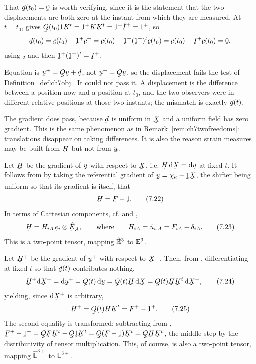 That $\bd(t_{0})=\bze$ is worth verifying, since it is the statement that
the two displacements are both zero at the instant from which they are
measured. At $t=t_{0}$,  gives
$\bQ(t_{0})\shift\bK^{t}=\shift^{+}\bK\bK^{t}=\shift^{+}\hI^{+}
=\shift^{+}$, so
\[
   \bd(t_{0})=\bc(t_{0})-\shift^{+}\bc^{+}
   =\bc(t_{0})-\shift^{+}(\shift^{+})^{t}\bc(t_{0})
   =\bc(t_{0})-\I^{+}\bc(t_{0})=\bze ,
\]
using $_{2}$ and then $\shift^{+}(\shift^{+})^{t}=\I^{+}$.

\begin{remark}\label{rem:ch7disp}
Equation  is $\bu^{+}=\bQ\bu+\bd$, not $\bu^{+}=\bQ\bu$, so
the displacement fails the test of Definition~\ref{def:ch7obj}. It could
not pass it. A displacement is the difference between a position now and
a position at $t_{0}$, and the two observers were in different relative
positions at those two instants; the mismatch is exactly $\bd(t)$.

The gradient does pass, because $\bd$ is uniform in $\bX$ and a uniform
field has zero gradient. This is the same phenomenon as in
Remark~\ref{rem:ch7twofreedoms}: translations disappear on taking
differences. It is also the reason strain measures may be built from
$\bH$ but not from $\bu$.
\end{remark}

Let $\bH$ be the gradient of $\bu$ with respect to $\bX$, i.e.
$\bH\,\dl\bX=\dl\bu$ at fixed $t$. It follows from  by taking
the referential gradient of $\bu=\bchi_{\kappa}-\shift\bX$, the shifter
being uniform so that its gradient is itself, that
\begin{equation}
   \bH=\bF-\shift .
   \tag{7.22}\label{eq:7.22}
\end{equation}
In terms of Cartesian components, cf.  and ,
\begin{equation}
   \bH=H_{iA}\,\be_{i}\otimes\hbE_{A},\qquad\text{where}\qquad
   H_{iA}=\hat u_{i,A}=F_{iA}-\dd_{iA}.
   \tag{7.23}\label{eq:7.23}
\end{equation}
This is a two-point tensor, mapping $\hat{\mathbb{E}}^{3}$ to $\mathbb{E}^{3}$.

Let $\bH^{+}$ be the gradient of $\bu^{+}$ with respect to $\bX^{+}$.
Then, from , differentiating at fixed $t$ so that $\bd(t)$
contributes nothing,
\begin{equation}
   \bH^{+}\dl\bX^{+}=\dl\bu^{+}=\bQ(t)\,\dl\bu=\bQ(t)\bH\,\dl\bX
   =\bQ(t)\bH\bK^{t}\,\dl\bX^{+},
   \tag{7.24}\label{eq:7.24}
\end{equation}
yielding, since $\dl\bX^{+}$ is arbitrary,
\begin{equation}
   \bH^{+}=\bQ(t)\bH\bK^{t}=\bF^{+}-\shift^{+}.
   \tag{7.25}\label{eq:7.25}
\end{equation}
The second equality is  transformed: subtracting 
from ,
$\bF^{+}-\shift^{+}=\bQ\bF\bK^{t}-\bQ\shift\bK^{t}
=\bQ(\bF-\shift)\bK^{t}=\bQ\bH\bK^{t}$, the middle step by the
distributivity of tensor multiplication. This, of course, is also a
two-point tensor, mapping $\hat{\mathbb{E}}^{3+}$ to $\mathbb{E}^{3+}$.

